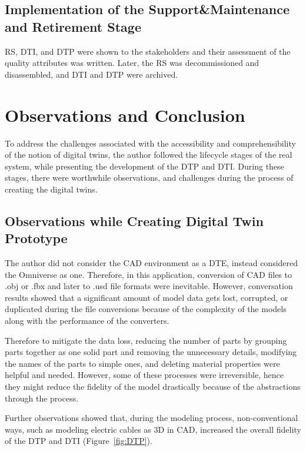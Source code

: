 \documentclass[conference]{IEEEtran}
\begin{document}
    \subsection{Implementation of the Support\&Maintenance and Retirement Stage}
    RS, DTI, and DTP were shown to the stakeholders and their assessment of the quality attributes was written. Later, the RS was decommissioned and disassembled, and DTI and DTP were archived.     

    \section{Observations and Conclusion} 

    To address the challenges associated with the accessibility and comprehensibility of the notion of digital twins, the author followed the lifecycle stages of the real system, 
    while presenting the development of the DTP and DTI. During these stages, there were worthwhile observations, and challenges during the process of creating the digital twins.     

    \subsection{Observations while Creating Digital Twin Prototype}

    The author did not consider the CAD environment as a DTE, instead considered the Omniverse as one. Therefore, in this application, conversion of CAD files to .obj or .fbx and later to .usd file formats were 
    inevitable. However, conversation results showed that a significant amount of model data gets lost, corrupted, or duplicated during the file conversions because of the complexity of 
    the models along with the performance of the converters.

    Therefore to mitigate the data loss, reducing the number of parts by grouping parts together as one solid part and removing the unnecessary details,
    modifying the names of the parts to simple ones, and deleting material properties were helpful and needed. However, some of these processes were irreversible, 
    hence they might reduce the fidelity of the model drastically because of the abstractions through the process.

    Further observations showed that, during the modeling process, non-conventional ways, such as modeling electric cables as 3D in CAD, increased the 
    overall fidelity of the DTP and DTI (Figure~\ref{fig:DTP}).
\end{document}
